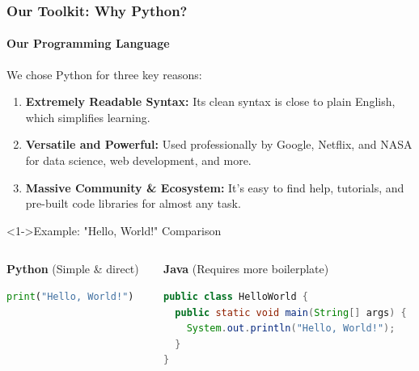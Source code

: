 \documentclass{beamer}
\begin{document}
\begin{frame}[fragile]
    \frametitle{Our Toolkit: Why Python?}
    \framesubtitle{Our Programming Language}
    
    We chose Python for three key reasons:
    \begin{enumerate}
        \item<1-> \textbf{Extremely Readable Syntax:} Its clean syntax is close to plain English, which simplifies learning.
        
        \item<2-> \textbf{Versatile and Powerful:} Used professionally by Google, Netflix, and NASA for data science, web development, and more.
        
        \item<3-> \textbf{Massive Community \& Ecosystem:} It's easy to find help, tutorials, and pre-built code libraries for almost any task.
    \end{enumerate}
    
    \begin{block}<1->{Example: "Hello, World!" Comparison}
    \begin{columns}[T]
        \begin{column}{0.48\textwidth}
            \textbf{Python} (Simple \& direct)
\begin{lstlisting}[language=Python]
print("Hello, World!")
\end{lstlisting}
        \end{column}
        \begin{column}{0.48\textwidth}
            \textbf{Java} (Requires more boilerplate)
\begin{lstlisting}[language=Java]
public class HelloWorld {
  public static void main(String[] args) {
    System.out.println("Hello, World!");
  }
}
\end{lstlisting}
        \end{column}
    \end{columns}
    \end{block}
    
\end{frame}
\end{document}
